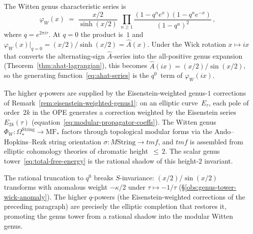 \begin{remark}%
\label{rem:ahat-witten-genus}%
%
The Witten genus characteristic series is
\[
 \varphi_W(x)
 \;=\;
 \frac{x/2}{\sinh(x/2)}
 \;\prod_{n \ge 1}
 \frac{(1 - q^n e^x)(1 - q^n e^{-x})}{(1 - q^n)^2}\,,
\]
where $q = e^{2\pi i\tau}$. At $q = 0$ the product
is~$1$ and $\varphi_W(x)|_{q=0} = (x/2)/\sinh(x/2)
= \hat{A}(x)$.
Under the Wick rotation $x \mapsto ix$ that converts
the alternating-sign $\hat{A}$-series into the
all-positive genus expansion
(Theorem~\ref{thm:ahat-lagrangian}), this becomes
$\hat{A}(ix) = (x/2)/\sin(x/2)$, so the
generating function~\eqref{eq:ahat-series} is the
$q^0$~term of $\varphi_W(ix)$.

The higher $q$-powers are supplied by
the Eisenstein-weighted genus-$1$ corrections of
Remark~\ref{rem:eisenstein-weighted-genus1}:
on an elliptic curve~$E_\tau$, each pole of
order~$2k$ in the OPE generates a correction weighted
by the Eisenstein series~$E_{2k}(\tau)$
(equation~\eqref{eq:modular-propagator-coeffs}).
The Witten genus $\Phi_W \colon
\Omega^{\mathrm{String}}_\ast \to \mathrm{MF}_\ast$
factors through topological modular forms via the
Ando--Hopkins--Rezk string orientation
$\sigma \colon M\mathrm{String} \to \mathit{tmf}$,
and $\mathit{tmf}$ is assembled from
elliptic cohomology theories
of chromatic height~${\le}\, 2$.
The scalar genus tower~\eqref{eq:total-free-energy}
is the rational shadow of this height-$2$ invariant.

The rational truncation to $q^0$ breaks $S$-invariance:
$(x/2)/\sin(x/2)$ transforms with anomalous weight
$-\kappa/2$ under $\tau \mapsto -1/\tau$
(\S\ref{obs:genus-tower-wick-anomaly}).
The higher $q$-powers (the Eisenstein-weighted
corrections of the preceding paragraph) are
precisely the elliptic completion that restores it,
promoting the genus tower from a rational shadow
into the modular Witten genus.
\end{remark}

